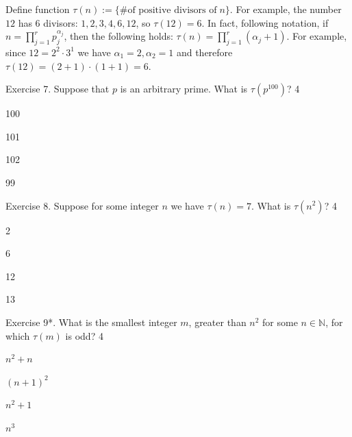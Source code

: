 \documentclass[../lecture-notes-148x210.tex]{subfiles}
\begin{document}
\begin{tcolorbox}
[ colback=blue!5!white, fonttitle=\bfseries, colframe=blue!80!white,
    title=Exercises 7-9. Tau Function] Define function $\tau(n) := \{\text{\#
    of positive divisors of}\; n\}$. For example, the number $12$ has 6 divisors:
    $1,2,3,4,6,12$, so $\tau(12)=6$. In fact, following
     notation, if $n=\prod_{j=1}^r
    p_j^{\alpha_j}$, then the following holds: $\tau(n) =
    \prod_{j=1}^r(\alpha_j + 1)$. For example, since $12=2^2 \cdot 3^1$ we have
    $\alpha_1=2,\alpha_2=1$ and therefore $\tau(12)=(2+1)\cdot (1+1)=6$. 
\end{tcolorbox}

\begin{xexercise}
    {Exercise 7.}
    {Suppose that $p$ is an arbitrary prime. What is $\tau(p^{100})$? }
    {4}
    {
        \item 100
        \item 101
        \item 102
        \item 99
    }    
\end{xexercise}

\begin{xexercise}
    {Exercise 8.}
    {Suppose for some integer $n$ we have $\tau(n)=7$. What is $\tau(n^2)$?}
    {4}
    {
        \item 2
        \item 6
        \item 12
        \item 13
    }    
\end{xexercise}

\begin{xexercise}
    {Exercise 9*.}
    {What is the smallest integer $m$, greater than $n^2$ for some $n \in \mathbb{N}$, for which $\tau(m)$ is odd?}
    {4}
    {
        \item $n^2+n$
        \item $(n+1)^2$
        \item $n^2+1$
        \item $n^3$
    }    
\end{xexercise}
\end{document}
